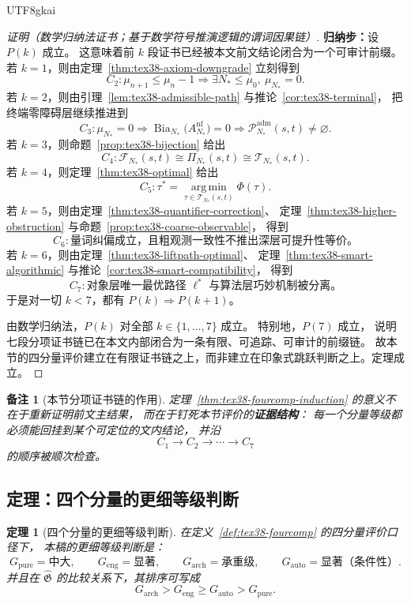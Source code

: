 \documentclass[12pt]{article}
\newtheorem{theorem}{定理}[section]
\newtheorem{remark}{备注}[section]
\newcommand{\Bia}{\operatorname{Bia}}
\begin{document}
\begin{CJK*}{UTF8}{gkai}
\begin{proof}[证明（数学归纳法证书；基于数学符号推演逻辑的谓词因果链）]
\textbf{归纳步：}设 $P(k)$ 成立。
这意味着前 $k$ 段证书已经被本文前文结论闭合为一个可审计前缀。
若 $k=1$，则由定理~\ref{thm:tex38-axiom-downgrade} 立刻得到
\[
  C_2:
  \mu_{n+1}\le \mu_n-1
  \Rightarrow
  \exists N_\ast\le \mu_0,\ \mu_{N_\ast}=0.
\]
若 $k=2$，则由引理~\ref{lem:tex38-admissible-path} 与推论~\ref{cor:tex38-terminal}，
把终端零障碍层继续推进到
\[
  C_3:
  \mu_{N_\ast}=0
  \Rightarrow
  \Bia_{N_\ast}\bigl(A_{N_\ast}^{\mathrm{nf}}\bigr)=0
  \Rightarrow
  \mathcal P^{\mathrm{adm}}_{N_\ast}(s,t)\neq\varnothing.
\]
若 $k=3$，则命题~\ref{prop:tex38-bijection} 给出
\[
  C_4:
  \mathcal F_{N_\ast}(s,t)
  \cong
  \Pi_{N_\ast}(s,t)
  \cong
  \mathcal T_{N_\ast}(s,t).
\]
若 $k=4$，则定理~\ref{thm:tex38-optimal} 给出
\[
  C_5:
  \tau^\ast
  =
  \operatorname*{arg\,min}_{\tau\in\mathcal T_{N_\ast}(s,t)}
  \Phi(\tau).
\]
若 $k=5$，则由定理~\ref{thm:tex38-quantifier-correction}、
定理~\ref{thm:tex38-higher-obstruction} 与命题~\ref{prop:tex38-coarse-observable}，
得到
\[
  C_6:
  \text{量词纠偏成立，且粗观测一致性不推出深层可提升性等价。}
\]
若 $k=6$，则由定理~\ref{thm:tex38-liftpath-optimal}、
定理~\ref{thm:tex38-smart-algorithmic} 与推论~\ref{cor:tex38-smart-compatibility}，
得到
\[
  C_7:
  \text{对象层唯一最优路径 }\ell^\ast\text{ 与算法层巧妙机制被分离。}
\]
于是对一切 $k<7$，都有 $P(k)\Rightarrow P(k+1)$。

由数学归纳法，$P(k)$ 对全部 $k\in\{1,\dots,7\}$ 成立。
特别地，$P(7)$ 成立，
说明七段分项证书链已在本文内部闭合为一条有限、可追踪、可审计的前缀链。
故本节的四分量评价建立在有限证书链之上，而非建立在印象式跳跃判断之上。定理成立。
\end{proof}

\begin{remark}[本节分项证书链的作用]
定理~\ref{thm:tex38-fourcomp-induction} 的意义不在于重新证明前文主结果，
而在于钉死本节评价的\textbf{证据结构}：
每一个分量等级都必须能回挂到某个可定位的文内结论，
并沿
\[
  C_1\to C_2\to\cdots\to C_7
\]
的顺序被顺次检查。
\end{remark}

\subsection{定理：四个分量的更细等级判断}
\label{subsec:tex38-fourcomp-theorem}

\begin{theorem}[四个分量的更细等级判断]
\label{thm:tex38-fourcomp-judgement}
在定义~\ref{def:tex38-fourcomp} 的四分量评价口径下，
本稿的更细等级判断是：
\[
  G_{\mathrm{pure}}=\text{中大},
  \qquad
  G_{\mathrm{eng}}=\text{显著},
  \qquad
  G_{\mathrm{arch}}=\text{承重级},
  \qquad
  G_{\mathrm{auto}}=\text{显著（条件性）}.
\]
并且在 $\widehat{\mathfrak G}$ 的比较关系下，其排序可写成
\[
  G_{\mathrm{arch}}
  >
  G_{\mathrm{eng}}
  \ge
  G_{\mathrm{auto}}
  >
  G_{\mathrm{pure}}.
\]
\end{theorem}


\end{CJK*}
\end{document}

